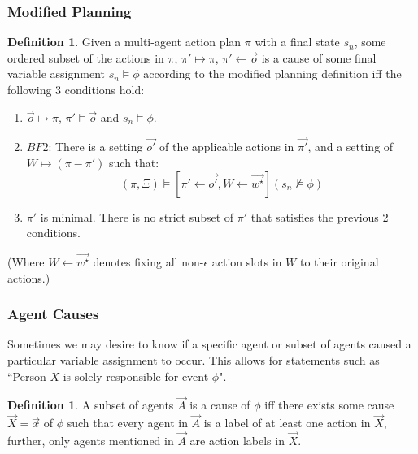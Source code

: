 \documentclass{article}
\theoremstyle{plain}
\theoremstyle{definition}
\newtheorem{defn}[thm]{Definition} %
\begin{document}
\subsubsection*{Modified Planning}
\begin{defn}
Given a multi-agent action plan $\pi$ with a final state $s_n$, some ordered subset of the actions in $\pi$, $\pi' \mapsto \pi$, $\pi' \leftarrow \vec{o}$ is a cause of some final variable assignment $s_n \models \phi$ according to the modified planning definition iff the following 3 conditions hold:
\begin{enumerate}
\item  $\vec{o} \mapsto \pi$, $\pi' \models \vec{o}$ and $s_n \models \phi$.
\item $BF2$: There is a setting $\vec{o'}$ of the applicable actions in $\vec{\pi'}$, and a setting of $W \mapsto (\pi  - \pi')$ such that:
\[
(\pi, \Xi) \models [\pi' \leftarrow \vec{o'}, W \leftarrow \vec{w^\star}](s_n \not\models \phi)
\]
\item $\pi'$ is minimal. There is no strict subset of $\pi'$ that satisfies the previous 2 conditions.
\end{enumerate}


(Where $W\leftarrow \vec{w^\star}$ denotes fixing all non-$\epsilon$ action slots in $W$ to their original actions.)

\end{defn}

\subsubsection*{Agent Causes}
Sometimes we may desire to know if a specific agent or subset of agents caused a particular variable assignment to occur. This allows for statements such as ``Person $X$ is solely responsible for event $\phi$".
\begin{defn}
A subset of agents $\vec{A}$ is a cause of $\phi$ iff there exists some cause $\vec{X}=\vec{x}$ of $\phi$ such that every agent in $\vec{A}$ is a label of at least one action in $\vec{X}$, further, only agents mentioned in $\vec{A}$ are action labels in $\vec{X}$.
\end{defn}
\end{document}
